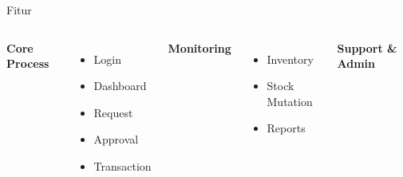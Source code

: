 \documentclass[aspectratio=169,14pt]{beamer}
\newcommand{\sectionlabel}[1]{
    {\fontsize{20}{24}\selectfont
    \textbf{\color{Primary}#1}}
}
\begin{document}
\begin{frame}{Fitur}

\vspace{-0.35cm}

\begin{columns}[T,totalwidth=\textwidth]



\sectionlabel{Core Process}

\vspace{0.18cm}

\begin{itemize}
    \setlength{\itemsep}{0.13cm}

    \item {\fontsize{16.5}{21}\selectfont Login}
    \item {\fontsize{16.5}{21}\selectfont Dashboard}
    \item {\fontsize{16.5}{21}\selectfont Request}
    \item {\fontsize{16.5}{21}\selectfont Approval}
    \item {\fontsize{16.5}{21}\selectfont Transaction}
\end{itemize}



\sectionlabel{Monitoring}

\vspace{0.18cm}

\begin{itemize}
    \setlength{\itemsep}{0.13cm}

    \item {\fontsize{16.5}{21}\selectfont Inventory}
    \item {\fontsize{16.5}{21}\selectfont Stock Mutation}
    \item {\fontsize{16.5}{21}\selectfont Reports}
\end{itemize}



\sectionlabel{Support \& Admin}


\end{columns}
\end{frame}
\end{document}
